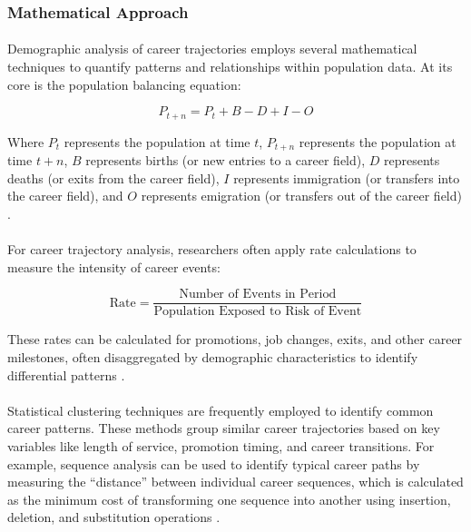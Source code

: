 \documentclass[../main.tex]{subfiles}
\begin{document}
\subsubsection{Mathematical Approach}

\paragraph{} Demographic analysis of career trajectories employs several mathematical techniques to quantify patterns and relationships within population data. At its core is the population balancing equation:

\begin{equation}
P_{t+n} = P_t + B - D + I - O
\end{equation}

Where $P_t$ represents the population at time $t$, $P_{t+n}$ represents the population at time $t+n$, $B$ represents births (or new entries to a career field), $D$ represents deaths (or exits from the career field), $I$ represents immigration (or transfers into the career field), and $O$ represents emigration (or transfers out of the career field) \citep{land2019mathematical, vanwissen2016dissertation}.

\paragraph{} For career trajectory analysis, researchers often apply rate calculations to measure the intensity of career events:

\begin{equation}
\text{Rate} = \frac{\text{Number of Events in Period}}{\text{Population Exposed to Risk of Event}}
\end{equation}

These rates can be calculated for promotions, job changes, exits, and other career milestones, often disaggregated by demographic characteristics to identify differential patterns \citep{gale2024demographics, land2019mathematical}.

\paragraph{} Statistical clustering techniques are frequently employed to identify common career patterns. These methods group similar career trajectories based on key variables like length of service, promotion timing, and career transitions. For example, sequence analysis can be used to identify typical career paths by measuring the ``distance'' between individual career sequences, which is calculated as the minimum cost of transforming one sequence into another using insertion, deletion, and substitution operations \citep{nataraj2018career}.
\end{document}
